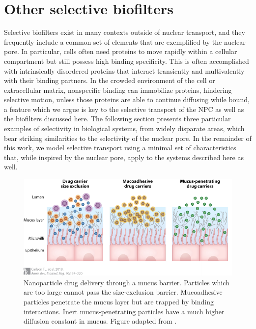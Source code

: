 \section{Other selective biofilters}
\label{sec:other-systems}

Selective biofilters exist in many contexts outside of nuclear transport, and they frequently include a common set of elements that are exemplified by the nuclear pore.  In particular, cells often need proteins to move rapidly within a cellular compartment but still possess high binding specificity.  This is often accomplished with intrinsically disordered proteins that interact transiently and multivalently with their binding partners.  In the crowded environment of the cell or extracellular matrix, nonspecific binding can immobilize proteins, hindering selective motion, unless those proteins are able to continue diffusing while bound, a feature which we argue is key to the selective transport of the NPC as well as the biofilters discussed here. The following section presents three particular examples of selectivity in biological systems, from widely disparate areas, which bear striking similarities to the selectivity of the nuclear pore.  In the remainder of this work, we model selective transport using a minimal set of characteristics that, while inspired by the nuclear pore, apply to the systems described here as well.


\begin{figure}[t!]
\centering
\includegraphics[width=0.8\linewidth]{figs/ch01/carlson-mucus.pdf}
\caption[Nanoparticle drug delivery through a mucus barrier.]{ Nanoparticle drug delivery through a mucus barrier.  Particles which are too large cannot pass the size-exclusion barrier.  Mucoadhesive particles penetrate the mucus layer but are trapped by binding interactions.  Inert mucus-penetrating particles have a much higher diffusion constant in mucus.  Figure adapted from \cite{carlson18,popov16}.}
\label{fig:mucus}
\end{figure}

